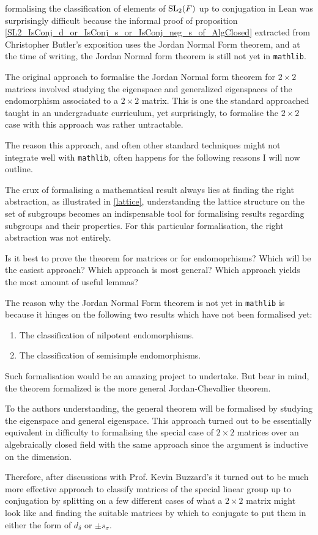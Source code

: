 \begin{remark}
formalising the classification of elements of $\operatorname{SL}_2(F)$ up to conjugation in Lean was surprisingly difficult because the informal proof of proposition \ref{SL2_IsConj_d_or_IsConj_s_or_IsConj_neg_s_of_AlgClosed} extracted from Christopher Butler's exposition 
uses the Jordan Normal Form theorem, and at the time of writing, the Jordan Normal form theorem is still not yet in \texttt{mathlib}.

The original approach to formalise the Jordan Normal form theorem for $2 \times 2$ matrices involved studying the eigenspace and generalized eigenspaces of the endomorphism associated to a $2 \times 2$ matrix.
This is one the standard approached taught in an undergraduate curriculum, yet surprisingly, to formalise the $2 \times 2$ case with this approach was rather untractable.

The reason this approach, and often other standard techniques might not integrate well with \texttt{mathlib}, often happens for the following reasons I will now outline.

The crux of formalising a mathematical result always lies at finding the right abstraction, as illustrated in \ref{lattice}, understanding the lattice structure on the set of subgroups becomes an indispensable tool for formalising
results regarding subgroups and their properties. For this particular formalisation, the right abstraction was not entirely.

Is it best to prove the theorem for matrices or for endomoprhisms? Which will be the easiest approach? Which approach is most general? Which approach yields the most amount of useful lemmas?

The reason why the Jordan Normal Form theorem is not yet in \texttt{mathlib} is because it hinges on the following two results which have not been formalised yet:

\begin{enumerate}
    \item The classification of nilpotent endomorphisms.
    \item The classification of semisimple endomorphisms.
\end{enumerate}

Such formalisation would be an amazing project to undertake. But bear in mind, the theorem formalized is the more general Jordan-Chevallier theorem.

To the authors understanding, the general theorem will be formalised by studying the eigenspace and general eigenspace. This approach turned out to be essentially equivalent in 
difficulty to formalising the special case of $2 \times 2$ matrices over an algebraically closed field with the same approach since the argument is inductive on the dimension.

Therefore, after discussions with Prof. Kevin Buzzard's it turned out to be much more effective approach to classify matrices of the special linear group up to 
conjugation by splitting on a few different cases of what a $2 \times 2$ matrix might look like and finding the suitable matrices by which to conjugate to put them in either the form of $d_\delta$ or $\pm s_\sigma$.
\end{remark}

